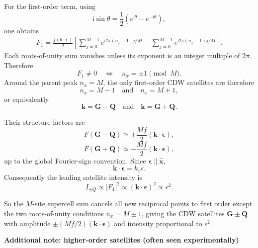 \documentclass[11pt]{article}
\newcommand{\e}{\epsilon}
\newcommand{\ii}{\mathrm{i}}
\newcommand{\bG}{\mathbf{G}}
\newcommand{\bQ}{\mathbf{Q}}
\newcommand{\bk}{\mathbf{k}}
\begin{document}
For the first-order term, using
\begin{equation}
\ii\sin\theta=\frac{1}{2}\left(e^{\ii\theta}-e^{-\ii\theta}\right),
\end{equation}
one obtains
\begin{align}
F_1
=\frac{f(\bk\cdot\bm{\e})}{2}
\left[
\sum_{j=0}^{M-1}e^{\ii2\pi(n_x+1)j/M}
-
\sum_{j=0}^{M-1}e^{\ii2\pi(n_x-1)j/M}
\right].
\end{align}
Each roots-of-unity sum vanishes unless its exponent is an integer multiple of $2\pi$. Therefore
\begin{equation}
    F_1\neq0
    \quad\Longleftrightarrow\quad
    n_x=\pm1\pmod M.
\end{equation}
Around the parent peak $n_x=M$, the only first-order CDW satellites are therefore
\begin{equation}
    \boxed{n_x=M-1\quad\text{and}\quad n_x=M+1},
\end{equation}
or equivalently
\begin{equation}
    \boxed{\bk=\bG-\bQ\quad\text{and}\quad\bk=\bG+\bQ}.
\end{equation}

Their structure factors are
\begin{equation}
    \boxed{
    F(\bG-\bQ)
    \simeq
    +\frac{Mf}{2}(\bk\cdot\bm{\e})
    },
\end{equation}
\begin{equation}
    \boxed{
    F(\bG+\bQ)
    \simeq
    -\frac{Mf}{2}(\bk\cdot\bm{\e})
    },
\end{equation}
up to the global Fourier-sign convention. Since $\bm{\e}\parallel\hat{\mathbf{x}}$,
\begin{equation}
    \bk\cdot\bm{\e}=k_x\e.
\end{equation}
Consequently the leading satellite intensity is
\begin{equation}
    \boxed{I_{\pm Q}\propto |F_1|^2\propto(\bk\cdot\bm{\e})^2\propto\e^2.}
\end{equation}

So the $M$-site supercell sum cancels all new reciprocal points to first order except the two roots-of-unity conditions $n_x=M\pm1$, giving the CDW satellites $\bG\pm\bQ$ with amplitude $\pm(Mf/2)(\bk\cdot\bm{\e})$ and intensity proportional to $\e^2$.

\newpage
\textbf{Additional note: higher-order satellites (often seen experimentally)}\\
\end{document}
